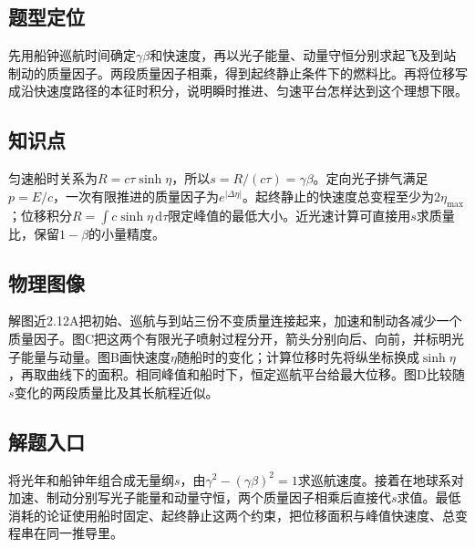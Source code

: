 \documentclass[UTF8,fontset=fandol,a4paper,11pt]{ctexart}
\begin{document}


\subsection*{题型定位}

先用船钟巡航时间确定$\gamma\beta$和快速度，再以光子能量、动量守恒分别求起飞及到站制动的质量因子。两段质量因子相乘，得到起终静止条件下的燃料比。再将位移写成沿快速度路径的本征时积分，说明瞬时推进、匀速平台怎样达到这个理想下限。



\subsection*{知识点}

匀速船时关系为$R=c\tau\sinh\eta$，所以$s=R/(c\tau)=\gamma\beta$。定向光子排气满足$p=E/c$，一次有限推进的质量因子为$e^{|\Delta\eta|}$。起终静止的快速度总变程至少为$2\eta_{\max}$；位移积分$R=\int c\sinh\eta\,\mathrm d\tau$限定峰值的最低大小。近光速计算可直接用$s$求质量比，保留$1-\beta$的小量精度。



\subsection*{物理图像}

解图近2.12A把初始、巡航与到站三份不变质量连接起来，加速和制动各减少一个质量因子。图C把这两个有限光子喷射过程分开，箭头分别向后、向前，并标明光子能量与动量。图B画快速度$\eta$随船时的变化；计算位移时先将纵坐标换成$\sinh\eta$，再取曲线下的面积。相同峰值和船时下，恒定巡航平台给最大位移。图D比较随$s$变化的两段质量比及其长航程近似。



\subsection*{解题入口}

将光年和船钟年组合成无量纲$s$，由$\gamma^2-(\gamma\beta)^2=1$求巡航速度。接着在地球系对加速、制动分别写光子能量和动量守恒，两个质量因子相乘后直接代$s$求值。最低消耗的论证使用船时固定、起终静止这两个约束，把位移面积与峰值快速度、总变程串在同一推导里。
\end{document}
